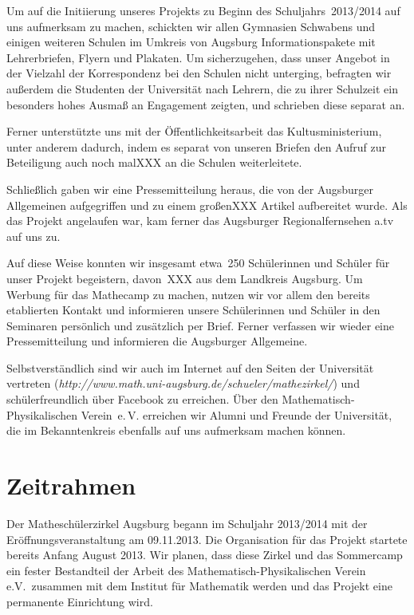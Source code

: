 \documentclass[12pt]{zettel}
\begin{document}
Um auf die Initiierung unseres Projekts zu Beginn des Schuljahrs~2013/2014 auf
uns aufmerksam zu machen, schickten wir allen Gymnasien Schwabens und einigen
weiteren Schulen im Umkreis von Augsburg Informationspakete mit Lehrerbriefen,
Flyern und Plakaten. Um sicherzugehen, dass unser Angebot in der
Vielzahl der Korrespondenz bei den Schulen nicht unterging, befragten wir außerdem
die Studenten der Universität nach Lehrern, die zu ihrer Schulzeit ein
besonders hohes Ausmaß an Engagement zeigten, und schrieben diese separat an.

Ferner unterstützte uns mit der Öffentlichkeitsarbeit das Kultusministerium,
unter anderem dadurch, indem es separat von unseren Briefen den Aufruf zur
Beteiligung auch noch malXXX an die Schulen weiterleitete.

Schließlich gaben wir eine Pressemitteilung heraus, die von der
Augsburger Allgemeinen aufgegriffen und zu einem großenXXX Artikel aufbereitet
wurde. Als das Projekt angelaufen war, kam ferner das Augsburger
Regionalfernsehen a.tv auf uns zu.

Auf diese Weise konnten wir insgesamt etwa~250 Schülerinnen und Schüler für
unser Projekt begeistern, davon~XXX aus dem Landkreis Augsburg. Um Werbung für
das Mathecamp zu machen, nutzen wir vor allem den bereits etablierten Kontakt
und informieren unsere Schülerinnen und Schüler in den Seminaren persönlich und
zusätzlich per Brief. Ferner verfassen wir wieder eine Pressemitteilung und
informieren die Augsburger Allgemeine.

Selbstverständlich sind wir auch im Internet auf den Seiten der Universität
vertreten (\textsl{http:/\!/www.math.uni-augsburg.de/schueler/mathezirkel/})
und schülerfreundlich über Facebook zu erreichen. Über den
Mathematisch-Physikalischen Verein~e.\,V. erreichen wir Alumni und Freunde der
Universität, die im Bekanntenkreis ebenfalls auf uns aufmerksam machen können.


\section{Zeitrahmen}

Der Matheschülerzirkel Augsburg begann im Schuljahr 2013/2014 mit der
Eröffnungsveranstaltung am 09.11.2013. Die Organisation für das Projekt
startete bereits Anfang August 2013. Wir planen, dass diese Zirkel und
das Sommercamp ein fester Bestandteil der Arbeit des
Mathematisch-Physikalischen Verein e.V.\ zusammen mit dem Institut für
Mathematik werden und das Projekt eine permanente Einrichtung wird.
\end{document}
